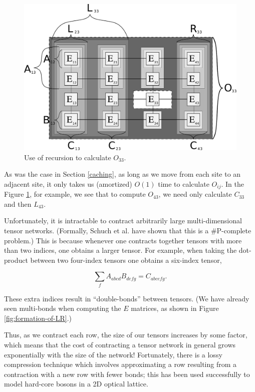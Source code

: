 \documentclass[12pt]{amsbook}
\theoremstyle{plain}
\theoremstyle{definition}
\theoremstyle{remark}
\begin{document}
\begin{figure}
\centering
\includegraphics[width=\columnwidth]{images/mypaper-diagram-38}
\caption{Use of recursion to calculate $O_{33}$. \label{fig:2d-recursive-structure}}
\end{figure}

As was the case in Section \ref{caching}, as long as we move from each site to an adjacent site, it only takes us (amortized) $O(1)$ time to calculate $O_{ij}$.  In the Figure \ref{fig:2d-recursive-structure}, for example, we see that to compute $O_{43}$, we need only calculate $C_{33}$ and then $L_{43}$.

Unfortunately, it is intractable to contract arbitrarily large multi-dimensional tensor networks.  (Formally, Schuch et al. \cite{quant-ph/0611050} have shown that this is a \#P-complete problem.)  This is because whenever one contracts together tensors with more than two indices, one obtains a larger tensor.  For example, when taking the dot-product between two four-index tensors one obtains a six-index tensor,

$$\sum_f A_{abcd} B_{defg} = C_{abcefg}.$$

\noindent These extra indices result in ``double-bonds'' between tensors.  (We have already seen multi-bonds when computing the $E$ matrices, as shown in Figure \ref{fig:formation-of-LR}.)

Thus, as we contract each row, the size of our tensors increases by some factor, which means that the cost of contracting a tensor network in general grows exponentially with the size of the network!  Fortunately, there is a lossy compression technique which involves approximating a row resulting from a contraction with a new row with fewer bonds;  this has been used successfully to model hard-core bosons in a 2D optical lattice\cite{cond-mat/0611522}.
\end{document}
